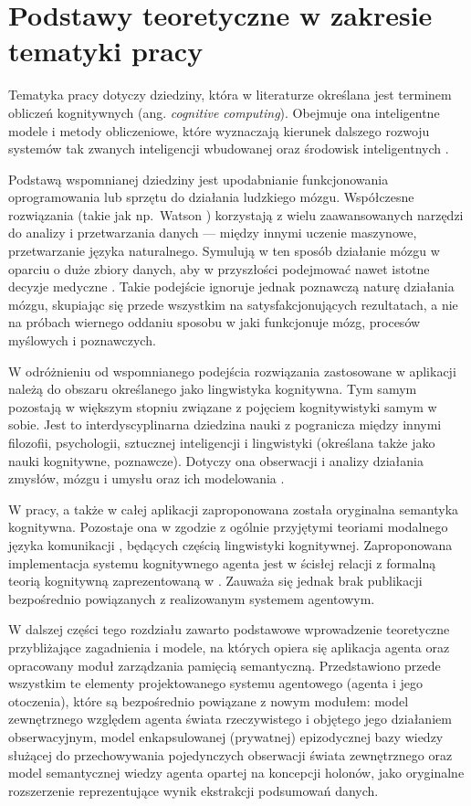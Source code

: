 
\chapter{Podstawy teoretyczne w zakresie tematyki pracy}

Tematyka pracy dotyczy dziedziny, która w literaturze określana jest terminem obliczeń kognitywnych (ang. \textit{cognitive computing}). Obejmuje ona inteligentne modele i metody obliczeniowe, które wyznaczają kierunek dalszego rozwoju systemów tak zwanych inteligencji wbudowanej oraz środowisk inteligentnych \cite{hur15}.

Podstawą wspomnianej dziedziny jest upodabnianie funkcjonowania oprogramowania lub sprzętu do działania ludzkiego mózgu. Współczesne rozwiązania (takie jak np.\ Watson \cite{kel13}) korzystają z wielu zaawansowanych narzędzi do analizy i przetwarzania danych --- między innymi uczenie maszynowe, przetwarzanie języka naturalnego. Symulują w ten sposób działanie mózgu w oparciu o duże zbiory danych, aby w przyszłości podejmować nawet istotne decyzje medyczne \cite{woo15}. Takie podejście ignoruje jednak poznawczą naturę działania mózgu, skupiając się przede wszystkim na satysfakcjonujących rezultatach, a nie na próbach wiernego oddaniu sposobu w jaki funkcjonuje mózg, procesów myślowych i poznawczych.

W odróżnieniu od wspomnianego podejścia rozwiązania zastosowane w aplikacji należą do obszaru określanego jako lingwistyka kognitywna. Tym samym pozostają w większym stopniu związane z pojęciem kognitywistyki samym w sobie. Jest to interdyscyplinarna dziedzina nauki z pogranicza między innymi filozofii, psychologii, sztucznej inteligencji i lingwistyki (określana także jako nauki kognitywne, poznawcze). Dotyczy ona obserwacji i analizy działania zmysłów, mózgu i umysłu oraz ich modelowania \cite{tha17}.

W pracy, a także w całej aplikacji zaproponowana została oryginalna semantyka kognitywna. Pozostaje ona w zgodzie z ogólnie przyjętymi teoriami modalnego języka komunikacji \cite{tal00}, będących częścią lingwistyki kognitywnej. Zaproponowana implementacja systemu kognitywnego agenta jest w ścisłej relacji z formalną teorią kognitywną zaprezentowaną w \cite{kat07}. Zauważa się jednak brak publikacji bezpośrednio powiązanych z realizowanym systemem agentowym.

W dalszej części tego rozdziału zawarto podstawowe wprowadzenie teoretyczne przybliżające zagadnienia i modele, na których opiera się aplikacja agenta oraz opracowany moduł zarządzania pamięcią semantyczną. Przedstawiono przede wszystkim te elementy projektowanego systemu agentowego (agenta i jego otoczenia), które są bezpośrednio powiązane z nowym modułem: model zewnętrznego względem agenta świata rzeczywistego i objętego jego działaniem obserwacyjnym, model enkapsulowanej (prywatnej) epizodycznej bazy wiedzy służącej do przechowywania pojedynczych obserwacji świata zewnętrznego oraz model semantycznej wiedzy agenta opartej na koncepcji holonów, jako oryginalne rozszerzenie reprezentujące wynik ekstrakcji podsumowań danych.

